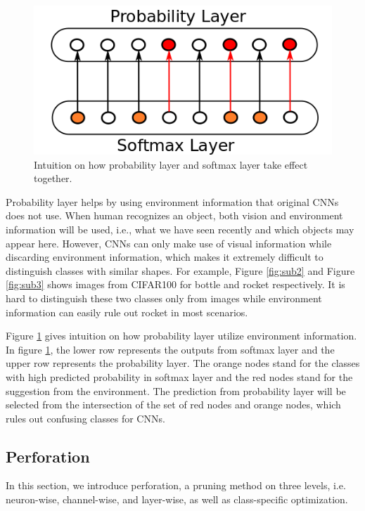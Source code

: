 \documentclass[pageno]{jpaper}
\begin{document}
\begin{figure}
  \centering
  \includegraphics[width=.45\textwidth]{intuition.png}
\caption{Intuition on how probability layer and softmax layer take effect together.}
  \label{fig:intuition}

\end{figure}





Probability layer helps by using environment information that original CNNs does not use. When human recognizes an object, both vision and environment information will be used, i.e., what we have seen recently and which objects may appear here. However, CNNs can only make use of visual information while discarding environment information, which makes it extremely difficult to distinguish classes with similar shapes. For example, Figure \ref{fig:sub2} and Figure \ref{fig:sub3} shows images from CIFAR100 for bottle and rocket respectively. It is hard to distinguish these two classes only from images while environment information can easily rule out rocket in most scenarios. 

Figure \ref{fig:intuition} gives intuition on how probability layer utilize environment information. In figure \ref{fig:intuition}, the lower row represents the outputs from softmax layer and the upper row represents the probability layer. The orange nodes stand for the classes with high predicted probability in softmax layer and the red nodes stand for the suggestion from the environment. The prediction from probability layer will be selected from the intersection of the set of red nodes and orange nodes, which rules out confusing classes for CNNs. 


\subsection{Perforation}
In this section, we introduce perforation, a pruning method on three levels, i.e. neuron-wise, channel-wise, and layer-wise, as well as class-specific optimization. 
\end{document}
